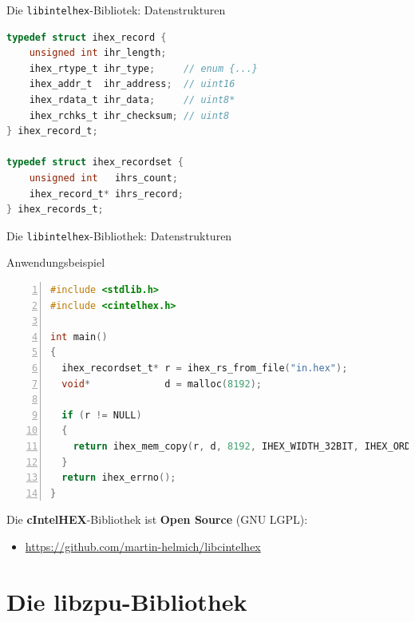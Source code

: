\documentclass[10pt]{beamer}
\begin{document}
	\begin{frame}[fragile]{Die \texttt{libintelhex}-Bibliotek: Datenstrukturen}
		\begin{lstlisting}[language=C]
typedef struct ihex_record {
    unsigned int ihr_length;
    ihex_rtype_t ihr_type;     // enum {...}
    ihex_addr_t  ihr_address;  // uint16
    ihex_rdata_t ihr_data;     // uint8*
    ihex_rchks_t ihr_checksum; // uint8
} ihex_record_t;

typedef struct ihex_recordset {
    unsigned int   ihrs_count;
    ihex_record_t* ihrs_record;
} ihex_records_t;
		\end{lstlisting}
	\end{frame}
	
	\begin{frame}{Die \texttt{libintelhex}-Bibliothek: Datenstrukturen}
	\begin{center}
		
		\end{center}
	\end{frame}
	
	\begin{frame}[fragile]{Anwendungsbeispiel}
		\begin{lstlisting}[language=C,breaklines=true,numbers=left]
#include <stdlib.h>
#include <cintelhex.h>

int main()
{
  ihex_recordset_t* r = ihex_rs_from_file("in.hex");
  void*             d = malloc(8192);
	
  if (r != NULL)
  {
    return ihex_mem_copy(r, d, 8192, IHEX_WIDTH_32BIT, IHEX_ORDER_BIGENDIAN);
  }
  return ihex_errno();
}
		\end{lstlisting}
	\end{frame}
	
	\begin{frame}
		Die \textbf{cIntelHEX}-Bibliothek ist \textbf{Open Source} (GNU LGPL):
		
		\begin{itemize}
			\item \url{https://github.com/martin-helmich/libcintelhex}
		\end{itemize}
	\end{frame}
	
	\section{Die libzpu-Bibliothek}
	
\end{document}
